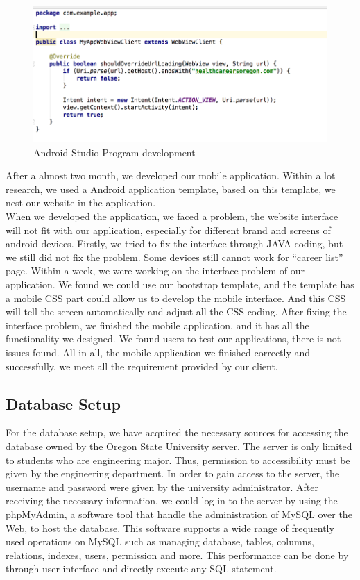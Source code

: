 \documentclass[onecolumn, draftclsnofoot,10pt, compsoc]{IEEEtran}
\begin{document}
\begin{figure}
\centerline{\includegraphics[scale=1]{coding.png} }
\caption{Android Studio Program development}
\end{figure}

\noindent After a almost two month, we developed our mobile application. Within a lot research, we used a Android application template, based on this template, we nest our website in the application. \\

\noindent When we developed the application, we faced a problem, the website interface will not fit with our application, especially for different brand and screens of android devices. Firstly, we tried to fix the interface through JAVA coding, but we still did not fix the problem. Some devices still cannot work for “career list” page. Within a week, we were working on the interface problem of our application. We found we could use our bootstrap template, and the template has a mobile CSS part could allow us to develop the mobile interface. And this CSS will tell the screen automatically and adjust all the CSS coding. 
After fixing the interface problem, we finished the mobile application, and it has all the functionality we designed. We found users to test our applications, there is not issues found. All in all, the mobile application we finished correctly and successfully, we meet all the requirement provided by our client.  \\

\subsection{Database Setup}
\noindent For the database setup, we have acquired the necessary sources for accessing the database owned by the Oregon State University server. 
The server is only limited to students who are engineering major. 
Thus, permission to accessibility must be given by the engineering department. 
In order to gain access to the server, the username and password were given by the university administrator. 
After receiving the necessary information, we could log in to the server by using the phpMyAdmin, a software tool that handle the administration of MySQL over the Web, to host the database. 
This software supports a wide range of frequently used operations on MySQL such as managing database, tables, columns, relations, indexes, users, permission and more. 
This performance can be done by through user interface and directly execute any SQL statement.\\
\end{document}
